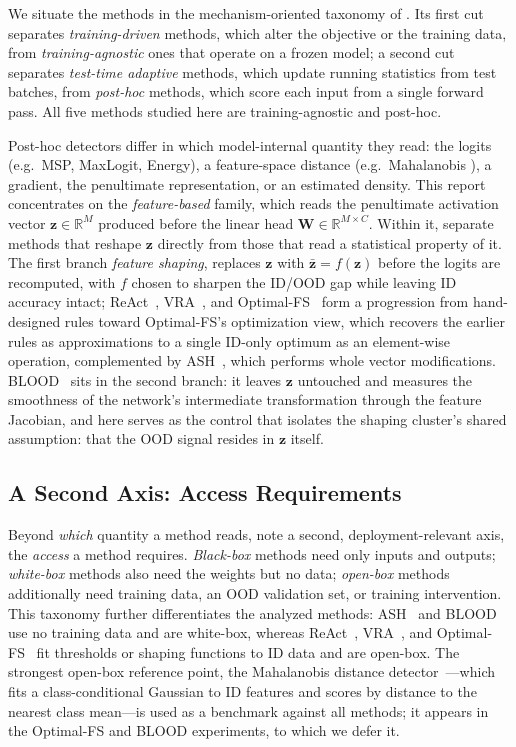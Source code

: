 \documentclass[a4paper]{article}
\begin{document}
We situate the methods in the mechanism-oriented taxonomy of \citet{survey}. Its
first cut separates \emph{training-driven} methods, which alter the objective or the
training data, from \emph{training-agnostic} ones that operate on a frozen model; a
second cut separates \emph{test-time adaptive} methods, which update running
statistics from test batches, from \emph{post-hoc} methods, which score each input
from a single forward pass. All five methods studied here are training-agnostic and
post-hoc.

Post-hoc detectors differ in which model-internal quantity they read: the logits
(e.g.\ MSP\cite{MSP}, MaxLogit, Energy\cite{energy}), a feature-space distance (e.g.\ Mahalanobis \cite{mahalanobis}), a
gradient, the penultimate representation, or an estimated density. This report
concentrates on the \emph{feature-based} family, which reads the penultimate
activation vector $\mathbf{z} \in \mathbb{R}^{M}$ produced before the linear head
$\mathbf{W} \in \mathbb{R}^{M \times C}$. Within it, \citet{survey} separate methods
that reshape $\mathbf{z}$ directly from those that read a statistical property of it.
The first branch \emph{feature shaping}, replaces $\mathbf{z}$ with $ \bar{\mathbf{z}}=f(\mathbf{z})$
before the logits are recomputed, with $f$ chosen to sharpen the ID/OOD gap while
leaving ID accuracy intact; ReAct~\cite{react}, VRA~\cite{vra}, and
Optimal-FS~\cite{optimalfs} form a progression from hand-designed rules toward
Optimal-FS's optimization view, which recovers the earlier rules as approximations to
a single ID-only optimum as an element-wise operation, complemented by ASH~\cite{ash}, which performs whole vector modifications. BLOOD~\cite{blood} sits in the second branch: it leaves
$\mathbf{z}$ untouched and measures the smoothness of the network's intermediate
transformation through the feature Jacobian, and here serves as the control that
isolates the shaping cluster's shared assumption: that the OOD signal resides in
$\mathbf{z}$ itself.

\subsection{A Second Axis: Access Requirements}
\label{subsec:access}

Beyond \emph{which} quantity a method reads, \citet{blood} note a second,
deployment-relevant axis, the \emph{access} a method requires. \emph{Black-box}
methods need only inputs and outputs; \emph{white-box} methods also need the weights
but no data; \emph{open-box} methods additionally need training data, an OOD
validation set, or training intervention. This taxonomy further differentiates the analyzed methods:
ASH~\cite{ash} and BLOOD~\cite{blood} use no training data and are white-box, whereas
ReAct~\cite{react}, VRA~\cite{vra}, and Optimal-FS~\cite{optimalfs} fit thresholds or
shaping functions to ID data and are open-box. The strongest open-box reference point, the Mahalanobis
distance detector~\cite{mahalanobis}---which fits a class-conditional Gaussian to ID
features and scores by distance to the nearest class mean---is used as a benchmark against
all methods; it appears in the Optimal-FS and BLOOD experiments, to which we defer it.
\end{document}
